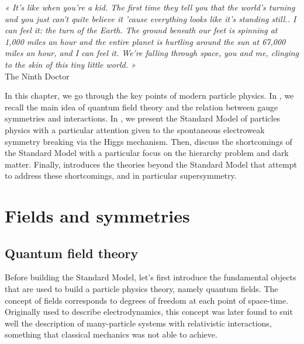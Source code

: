 \setcounter{mtc}{2}
\vspace*{-0.7cm}
\begin{center}
\begin{minipage}{0.95\textwidth}
\emph{« It’s like when you’re a kid. The first time they tell you that the world’s turning
and you just can’t quite believe it ’cause everything looks like it’s standing still.. I
can feel it: the turn of the Earth. The ground beneath our feet is spinning at 1,000 miles
an hour and the entire planet is hurtling around the sun at 67,000 miles an hour, and I
can feel it. We’re falling through space, you and me, clinging to the skin of this tiny
little world. »}\\
\hspace*{0.75\textwidth} The Ninth Doctor
\end{minipage}
\end{center}
\minitoc
\newpage

    In this chapter, we go through the key points of modern particle physics. In
    , we recall the main idea of quantum field theory
    and the relation between gauge symmetries and interactions. In ,
    we present the Standard Model of particles physics with a particular attention given
    to the spontaneous electroweak symmetry breaking via the Higgs mechanism. Then,
     discuss the shortcomings of the Standard
    Model with a particular focus on the hierarchy problem and dark matter. Finally,
     introduces the theories beyond the Standard
    Model that attempt to address these shortcomings, and in particular supersymmetry.

    \section{Fields and symmetries \label{sec:fieldsAndSymmetries}}

        \subsection{Quantum field theory}

    Before building the Standard Model, let's first introduce the fundamental objects
    that are used to build a particle physics theory, namely quantum fields. The concept
    of fields corresponds to degrees of freedom at each point of space-time. Originally
    used to describe electrodynamics, this concept was later found to suit well the
    description of many-particle systems with relativistic interactions, something that
    classical mechanics was not able to achieve.

